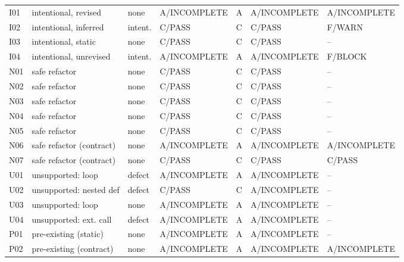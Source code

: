 \begin{table}[h!]
\begin{tabular}{lllllll}
I01 & intentional, revised & none & A/INCOMPLETE & A & A/INCOMPLETE & A/INCOMPLETE \\
I02 & intentional, inferred & intent. & C/PASS & C & C/PASS & F/WARN \\
I03 & intentional, static & none & C/PASS & C & C/PASS & -- \\
I04 & intentional, unrevised & intent. & A/INCOMPLETE & A & A/INCOMPLETE & F/BLOCK \\
N01 & safe refactor & none & C/PASS & C & C/PASS & -- \\
N02 & safe refactor & none & C/PASS & C & C/PASS & -- \\
N03 & safe refactor & none & C/PASS & C & C/PASS & -- \\
N04 & safe refactor & none & C/PASS & C & C/PASS & -- \\
N05 & safe refactor & none & C/PASS & C & C/PASS & -- \\
N06 & safe refactor (contract) & none & A/INCOMPLETE & A & A/INCOMPLETE & A/INCOMPLETE \\
N07 & safe refactor (contract) & none & C/PASS & C & C/PASS & C/PASS \\
U01 & unsupported: loop & defect & A/INCOMPLETE & A & A/INCOMPLETE & -- \\
U02 & unsupported: nested def & defect & C/PASS & C & A/INCOMPLETE & -- \\
U03 & unsupported: loop & none & A/INCOMPLETE & A & A/INCOMPLETE & -- \\
U04 & unsupported: ext. call & defect & A/INCOMPLETE & A & A/INCOMPLETE & -- \\
P01 & pre-existing (static) & none & A/INCOMPLETE & A & A/INCOMPLETE & -- \\
P02 & pre-existing (contract) & none & A/INCOMPLETE & A & A/INCOMPLETE & A/INCOMPLETE \\
\bottomrule
\end{tabular}
\end{table}
